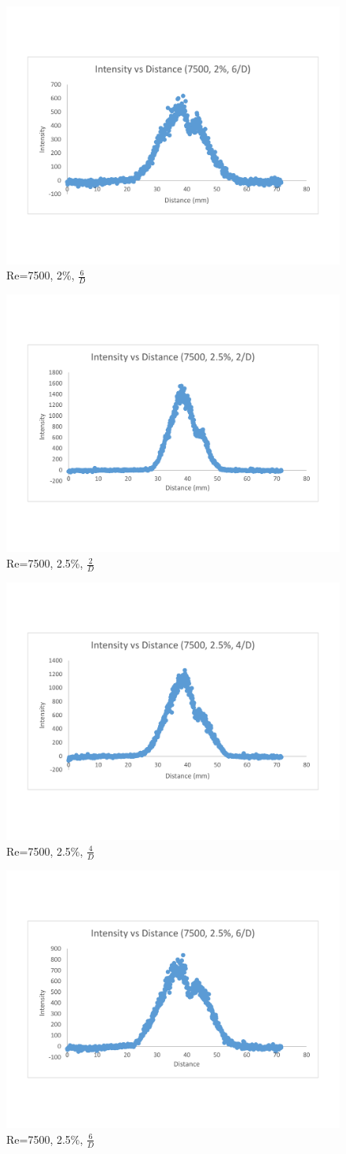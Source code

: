 \documentclass[preview,12pt]{article}
\begin{document}
\begin{figure}[h]
    \centering
    \includegraphics[width=0.55\linewidth]{RE-7500-20-cs6D.pdf}
    \caption{{\footnotesize Re=7500, 2\%, $\frac{6}{D}$ }}
\end{figure}\begin{figure}[h]
    \centering
    \includegraphics[width=0.55\linewidth]{RE-7500-25-cs2D.pdf}
    \caption{{\footnotesize Re=7500, 2.5\%, $\frac{2}{D}$ }}
\end{figure}\begin{figure}[h]
    \centering
    \includegraphics[width=0.55\linewidth]{RE-7500-25-cs4D.pdf}
    \caption{{\footnotesize Re=7500, 2.5\%, $\frac{4}{D}$ }}
\end{figure}
\begin{figure}[h]
    \centering
    \includegraphics[width=0.55\linewidth]{RE-7500-25-cs6D.pdf}
    \caption{{\footnotesize Re=7500, 2.5\%, $\frac{6}{D}$ }}
\end{figure}
\end{document}
